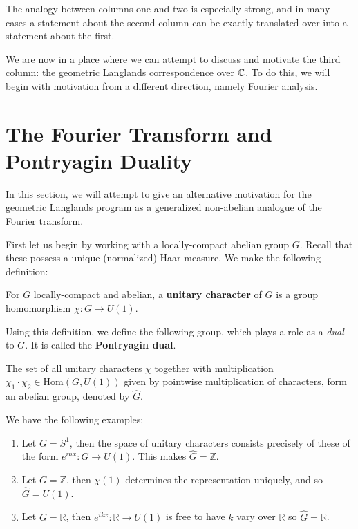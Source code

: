 The analogy between columns one and two is especially strong, and in many cases a statement about the second column can be exactly translated over into a statement about the first. %


We are now in a place where we can attempt to discuss and motivate the third column: the geometric Langlands correspondence over $\mathbb{C}$. To do this, we will begin with motivation from a different direction, namely Fourier analysis.



\section{The Fourier Transform and Pontryagin Duality} %
\label{sec:the_fourier_transform_and_pontryagin_duality}
		
In this section, we will attempt to give an alternative motivation for the geometric Langlands program as a generalized non-abelian analogue of the Fourier transform. 

First let us begin by working with a locally-compact abelian group $G$. Recall that these possess a unique (normalized) Haar measure. We make the following definition:
\begin{defn}
	For $G$ locally-compact and abelian, a \textbf{unitary character} of $G$ is a group homomorphism $\chi: G \to U(1)$.
\end{defn}
Using this definition, we define the following group, which plays a role as a \emph{dual} to $G$. It is called the \textbf{Pontryagin dual}.
\begin{defn}
	The set of all unitary characters $\chi$ together with multiplication  $\chi_1 \cdot \chi_2 \in \mathrm{Hom}(G, U(1))$ given by pointwise multiplication of characters, form an abelian group, denoted by $\widehat{G}.$
\end{defn}

\begin{eg}
	We have the following examples:
	\begin{enumerate}
		\item Let $G = S^1$, then the space of unitary characters consists precisely of these of the form $e^{inx}: G \to U(1)$. This makes $\widehat G = \mathbb Z$.
		\item Let $G = \mathbb Z$, then $\chi(1)$ determines the representation uniquely, and so $\widehat G = U(1)$.
		\item 			Let $G = \mathbb R$, then $e^{ikx} : \mathbb R \to U(1)$ is free to have $k$ vary over $\mathbb R$ so $\widehat G = \mathbb R$.
	\end{enumerate}

\end{eg}

